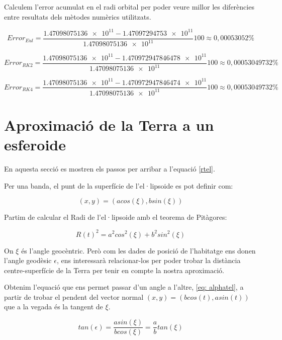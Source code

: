 \documentclass[11pt]{article}
\begin{document}
Calculem l'error acumulat en el radi orbital per poder veure millor les diferències entre resultats dels mètodes numèrics utilitzats.

\begin{equation}
    Error_{Eul} = \frac{\num{1.47098075136e11}-\num{1.47097294753e11}}{\num{1.47098075136e11}}100\approx0,00053052\%
\end{equation}

\begin{equation}
    Error_{RK2} = \frac{\num{1.47098075136e11}-\num{1.470972947846478e11}}{\num{1.47098075136e11}}100\approx0,00053049732\%
\end{equation}

\begin{equation}
    Error_{RK4} = \frac{\num{1.47098075136e11}-\num{1.470972947846474e11}}{\num{1.47098075136e11}}100\approx0,00053049732\%
\end{equation}

\section{Aproximació de la Terra a un esferoide}
\label{sec: terraesferoidedibuix}
En aquesta secció es mostren els passos per arribar a l'equació \eqref{rtel}.

Per una banda, el punt de la superfície de l'el·lipsoide es pot definir com:

\begin{equation}
    (x,y) = (acos(\xi),bsin(\xi))
\end{equation}

Partim de calcular el Radi de l'el·lipsoide amb el teorema de Pitàgores:

\begin{equation}
    R(t)^2 = a^2cos^2(\xi) + b^2sin^2(\xi)
    \label{eq: Pitagoreselipsoide}
\end{equation}

On $\xi$ és l'angle geocèntric. Però com les dades de posició de l'habitatge ens donen l'angle geodèsic $\epsilon$, ens interessarà relacionar-los per poder trobar la distància centre-superfície de la Terra per tenir en compte la nostra aproximació.

Obtenim l'equació que ens permet passar d'un angle a l'altre, \eqref{eq: alphatel}, a partir de trobar el pendent del vector normal $(x,y) = (bcos(t), asin(t))$ que a la vegada és la tangent de $\xi$.

\begin{equation}
    tan(\epsilon) = \frac{asin(\xi)}{bcos(\xi)} = \frac{a}{b}tan(\xi)
\end{equation}
\end{document}
